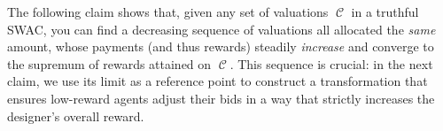 \documentclass[11pt,letterpaper]{article}
\newcommand{\Bedit}[1]{ {\color{darkcyan}#1}}
\newcommand{\swac}{SWAC\xspace}
\DeclareMathOperator{\A}{\auc{A}}
\DeclareMathOperator{\C}{\mathcal{C}}
\theoremstyle{plain}
\newcommand{\auc}[1]{\mathsf{#1}}
\begin{document}

The following claim shows that, given any set of valuations $\C$ in a truthful \swac, you can find a decreasing sequence of valuations all allocated the \emph{same} amount, whose payments (and thus rewards) steadily \emph{increase} and converge to the supremum of rewards attained on $\C$.
This sequence is crucial: in the next claim, we use its limit as a reference point to construct a transformation that ensures low-reward agents adjust their bids in a way that strictly increases the designer’s overall reward.
\end{document}
